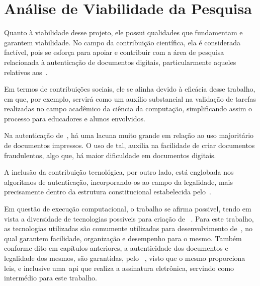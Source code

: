 \newcommand{\footnotegantt}{
    \footnote{O Gráfico de Gantt, também conhecido como Diagrama de Gantt,
        é uma ferramenta visual para controlar o cronograma de um projeto ou
        de uma programação de produção, ajudando a avaliar os prazos de
        entrega e os recursos críticos.
        Disponível em:
        \url{https://www.nomus.com.br/blog-industrial/grafico-de-gantt/}
    }
}
\chapter{Análise de Viabilidade da Pesquisa}
\label{ch:analise-de-viabilidade-da-pesquisa}

Quanto à viabilidade desse projeto, ele possui qualidades que fundamentam e
garantem viabilidade.
No campo da contribuição científica, ela é considerada factível, pois se
esforça para
apoiar e contribuir com a área de pesquisa relacionada à autenticação de
documentos
digitais, particularmente aqueles relativos aos~.

Em termos de contribuições sociais, ele se alinha devido à eficácia desse
trabalho,
em que, por exemplo, servirá como um auxílio substancial na validação de tarefas
realizadas no campo acadêmico da ciência da computação, simplificando assim o
processo para educadores e alunos envolvidos.

Na autenticação de~, há uma lacuna muito grande em relação ao
uso majoritário de documentos impressos.
O uso de tal, auxilia na facilidade de criar documentos fraudulentos, algo que,
há maior dificuldade em documentos digitais.

A inclusão da contribuição tecnológica, por outro lado, está englobada nos
algoritmos
de autenticação, incorporando-os ao campo da legalidade, mais precisamente
dentro
da estrutura constitucional estabelecida pelo~\citeauthor*{govbr2020}.

Em questão de execução computacional, o trabalho se afirma possivel,
tendo em vista a diversidade de tecnologias possiveis para criação de
~.
Para este trabalho, as tecnologias utilizadas são comumente utilizadas para
desenvolvimento de~, no qual garantem facilidade, organização
e desempenho para o mesmo.
Também conforme dito em capítulos anteriores, a autenticidade dos documentos
e legalidade dos mesmos, são garantidas, pelo ~\citeauthor*{govbr2020},
visto que o mesmo proporciona leis, e inclusive uma~\acrshort{api} que
realiza a assinatura eletrônica, servindo como intermédio para este trabalho.

